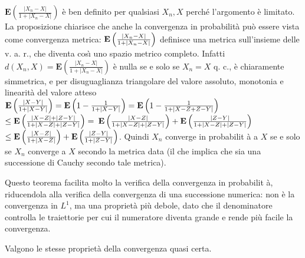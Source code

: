 \documentclass{article}
\begin{document}
$\mathbf{E}\left( \frac{\left\vert X_{n}-X\right\vert }{1+\left\vert
X_{n}-X\right\vert }\right) $ \`{e} ben definito per qualsiasi $X_{n},X$
perch\'{e} l'argomento \`{e} limitato. La proposizione chiarisce che anche
la convergenza in probabilit\`{a} pu\`{o} essere vista come convergenza
metrica: $\mathbf{E}\left( \frac{\left\vert X_{n}-X\right\vert }{%
1+\left\vert X_{n}-X\right\vert }\right) $ definisce una metrica
sull'insieme delle v. a. r., che diventa cos\`{\i} uno spazio metrico
completo. Infatti $d\left( X_{n},X\right) =\mathbf{E}\left( \frac{\left\vert
X_{n}-X\right\vert }{1+\left\vert X_{n}-X\right\vert }\right) $ \`{e} nulla
se e solo se $X_{n}=X$ q. c., \`{e} chiaramente simmetrica, e per
disuguaglianza triangolare del valore assoluto, monotonia e linearit\`{a}
del valore atteso $\mathbf{E}\left( \frac{\left\vert X-Y\right\vert }{%
1+\left\vert X-Y\right\vert }\right) =\mathbf{E}\left( 1-\frac{1}{%
1+\left\vert X-Y\right\vert }\right) =\mathbf{E}\left( 1-\frac{1}{%
1+\left\vert X-Z+Z-Y\right\vert }\right) $ $\leq \mathbf{E}\left( \frac{%
\left\vert X-Z\right\vert +\left\vert Z-Y\right\vert }{1+\left\vert
X-Z\right\vert +\left\vert Z-Y\right\vert }\right) =$ $\mathbf{E}\left( 
\frac{\left\vert X-Z\right\vert }{1+\left\vert X-Z\right\vert +\left\vert
Z-Y\right\vert }\right) +\mathbf{E}\left( \frac{\left\vert Z-Y\right\vert }{%
1+\left\vert X-Z\right\vert +\left\vert Z-Y\right\vert }\right) $ $\leq 
\mathbf{E}\left( \frac{\left\vert X-Z\right\vert }{1+\left\vert
X-Z\right\vert }\right) +\mathbf{E}\left( \frac{\left\vert Z-Y\right\vert }{%
1+\left\vert Z-Y\right\vert }\right) $. Quindi $X_{n}$ converge in probabilit%
\`{a} a $X$ se e solo se $X_{n}$ converge a $X$ secondo la metrica data (il
che implica che sia una successione di Cauchy secondo tale metrica).

Questo teorema facilita molto la verifica della convergenza in probabilit%
\`{a}, riducendola alla verifica della convergenza di una successione
numerica: non \`{e} la convergenza in $L^{1}$, ma una propriet\`{a} pi\`{u}
debole, dato che il denominatore controlla le traiettorie per cui il
numeratore diventa grande e rende pi\`{u} facile la convergenza.

Valgono le stesse propriet\`{a} della convergenza quasi certa.
\end{document}
